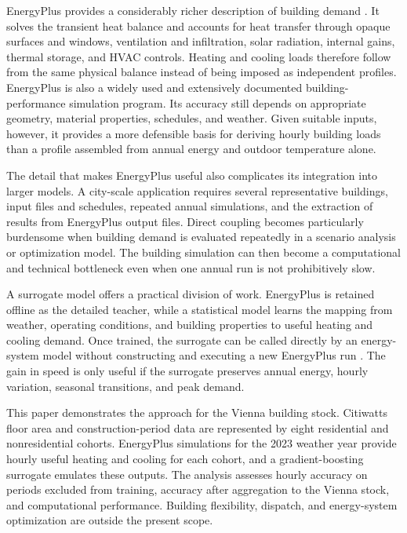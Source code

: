 \documentclass[conference]{IEEEtran}
\begin{document}
EnergyPlus provides a considerably richer description of building demand
\cite{Crawley2001,EnergyPlus2026}. It solves the transient heat balance and accounts for heat
transfer through opaque surfaces and windows, ventilation and infiltration,
solar radiation, internal gains, thermal storage, and HVAC controls. Heating
and cooling loads therefore follow from the same physical balance instead of
being imposed as independent profiles. EnergyPlus is also a widely used and
extensively documented building-performance simulation program. Its accuracy
still depends on appropriate geometry, material properties, schedules, and
weather. Given suitable inputs, however, it provides a more defensible basis
for deriving hourly building loads than a profile assembled from annual
energy and outdoor temperature alone.

The detail that makes EnergyPlus useful also complicates its integration into
larger models. A city-scale application requires several representative
buildings, input files and schedules, repeated annual simulations, and the
extraction of results from EnergyPlus output files. Direct coupling becomes
particularly burdensome when building demand is evaluated repeatedly in a
scenario analysis or optimization model. The building simulation can then
become a computational and technical bottleneck even when one annual run is
not prohibitively slow.

A surrogate model offers a practical division of work. EnergyPlus is retained
offline as the detailed teacher, while a statistical model learns the mapping
from weather, operating conditions, and building properties to useful heating
and cooling demand. Once trained, the surrogate can be called directly by an
energy-system model without constructing and executing a new EnergyPlus run
\cite{Westermann2019,Amasyali2018}. The gain in speed is only useful if the surrogate preserves
annual energy, hourly variation, seasonal transitions, and peak demand.

This paper demonstrates the approach for the Vienna building stock. Citiwatts
floor area and construction-period data are represented by eight residential
and nonresidential cohorts. EnergyPlus simulations for the 2023 weather year
provide hourly useful heating and cooling for each cohort, and a
gradient-boosting surrogate emulates these outputs. The analysis assesses
hourly accuracy on periods excluded from training, accuracy after aggregation
to the Vienna stock, and computational performance. Building flexibility,
dispatch, and energy-system optimization are outside the present scope.
\end{document}
